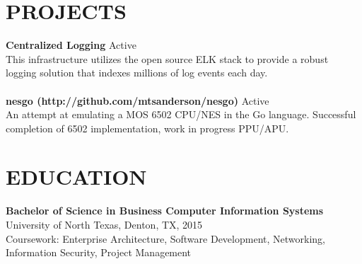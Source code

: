 \documentclass[line, margin,]{res}
\begin{document}
\begin{resume}
\section{PROJECTS}
\textbf{Centralized Logging} \hfill Active \\ [5pt]
This infrastructure utilizes the open source ELK stack to provide a robust logging solution that indexes millions of log events each day. \\ \\
\textbf{nesgo (http://github.com/mtsanderson/nesgo)} \hfill Active \\ [5pt]
An attempt at emulating a MOS 6502 CPU/NES in the Go language. Successful completion of 6502 implementation, work in progress PPU/APU.

\section{EDUCATION} 
\textbf{Bachelor of Science in Business Computer Information Systems} \\
University of North Texas, Denton, TX, 2015 \\
Coursework: Enterprise Architecture, Software Development, Networking, Information Security, Project Management
 
\end{resume}
\end{document}

